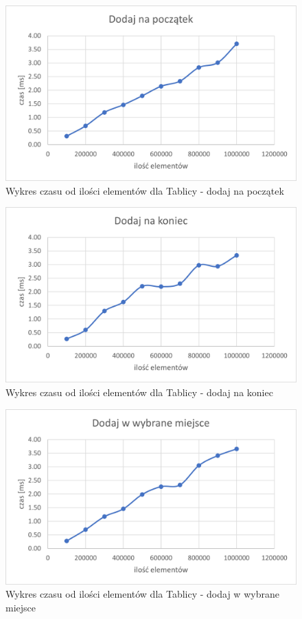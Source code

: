 \documentclass{article}
\begin{document}
    \begin{figure}[H]
        \centering
        \includegraphics[scale = 0.85]{wykresy/arr/addFirst.png}
        \caption{Wykres czasu od ilości elementów dla Tablicy - dodaj na początek}
    \end{figure}

    \begin{figure}[H]
        \centering
        \includegraphics[scale = 0.85]{wykresy/arr/addLast.png}
        \caption{Wykres czasu od ilości elementów dla Tablicy - dodaj na koniec}
    \end{figure}

    \begin{figure}[H]
        \centering
        \includegraphics[scale = 0.85]{wykresy/arr/addIndex.png}
        \caption{Wykres czasu od ilości elementów dla Tablicy - dodaj w wybrane miejsce}
    \end{figure}
\end{document}
